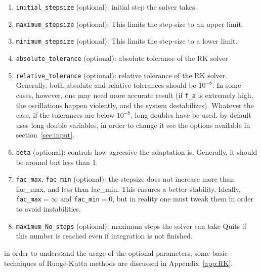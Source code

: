 \documentclass[11pt,a4paper]{article}
\begin{document}
\begin{enumerate}
	\item {\tt initial\_stepsize} (optional): initial step the solver takes. 
	
	\item {\tt maximum\_stepsize} (optional): This limits the step-size to an upper limit. 
	\item {\tt minimum\_stepsize} (optional): This limits the step-size to a lower limit. 
	
	\item {\tt absolute\_tolerance} (optional): absolute tolerance of the RK solver
	
	\item {\tt relative\_tolerance} (optional): relative tolerance of the RK solver.
	Generally, both absolute and relative tolerances should be $10^{-8}$. 
	In some cases, however, one may need more accurate result (\eg if {\tt f\_a} is extremely high, 
	the oscillations happen violently, and the system destabilizes). Whatever the case, if the  
	tolerances are below $10^{-8}$, long doubles have be used. \mimes by default uses {long double} variables, 
	in order to change it see the options available in section~\ref{sec:input}.
	
	\item {\tt beta} (optional): controls how agreesive the adaptation is. Generally, it should be around but less than 1.
	
	\item {\tt fac\_max},  {\tt fac\_min} (optional): the stepsize does not increase more than fac\_max, and less than fac\_min. 
	This ensures a better stability. Ideally, {\tt fac\_max}$=\infty$ and {\tt fac\_min}$=0$, but in reality one must 
	tweak them in order to avoid instabilities.
	
	\item {\tt maximum\_No\_steps} (optional): maximum steps the solver can take Quits if this number is reached even if integration
	is not finished. 
\end{enumerate}
%
in order to understand the usage of the optional parameters, some basic techniques of Runge-Kutta methods are discussed in Appendix~\ref{app:RK}. 
\end{document}
